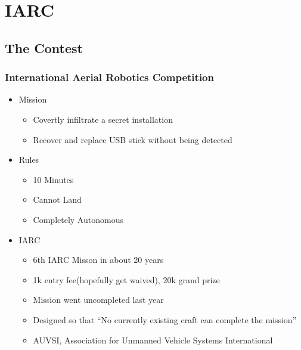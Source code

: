 \documentclass{beamer}
\begin{document}
\section{IARC}
\subsection{The Contest}
\frame
{
    \frametitle{International Aerial Robotics Competition}

    \begin{itemize}
        \item Mission
            \begin{itemize}
                \item Covertly infiltrate a secret installation
                \item Recover and replace USB stick without being detected
            \end{itemize}
        \item Rules
            \begin {itemize}
                \item 10 Minutes
                \item Cannot Land
                \item Completely Autonomous
            \end {itemize}
        \item IARC
            \begin{itemize}
                \item 6th IARC Misson in about 20 years
                \item 1k entry fee(hopefully get waived), 20k grand prize
                \item Mission went uncompleted last year
                \item Designed so that ``No currently existing craft can complete the mission''
                \item AUVSI, Association for Unmanned Vehicle Systems International
            \end{itemize}
    \end{itemize}
}

\end{document}
